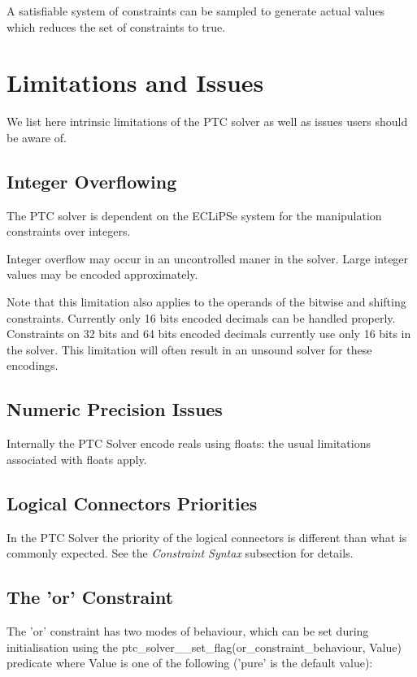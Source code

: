 \documentclass{article}
\begin{document}
A satisfiable system of constraints can be sampled to generate actual values
which reduces the set of constraints to true.

\section{Limitations and Issues}
We list here intrinsic limitations of the PTC solver as well as issues users should be aware of.

\subsection{Integer Overflowing}

The PTC solver is dependent on the ECLiPSe system for the manipulation constraints over integers. 

Integer overflow may occur in an uncontrolled maner in the solver. Large integer values may be encoded approximately.
 
Note that this limitation also applies to the operands of the bitwise and shifting constraints. Currently only 16 bits encoded decimals can be handled properly. Constraints on 32 bits and 64 bits encoded decimals currently  use only 16 bits in the solver. This limitation will often result in an unsound solver for these encodings.

\subsection{Numeric Precision Issues}

Internally the PTC Solver encode reals using floats: the usual limitations associated with floats apply.

\subsection{Logical Connectors Priorities}

In the PTC Solver the priority of the logical connectors is different than what
is commonly expected. See the \textit{Constraint Syntax} subsection for details.

\subsection{The 'or' Constraint}

The 'or' constraint has two modes of behaviour, which can be set during
initialisation using the \linebreak
ptc\_solver\_\_set\_flag(or\_constraint\_behaviour, Value)
predicate where Value is one of the following ('pure' is the default value):
\end{document}
